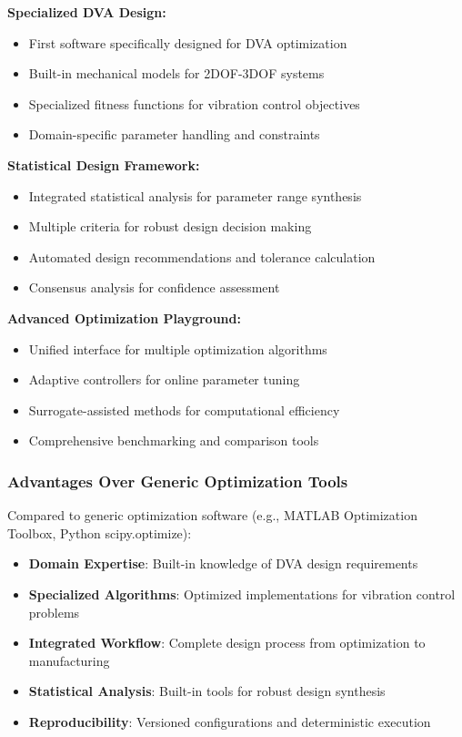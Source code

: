 \documentclass[12pt,a4paper]{article}
\begin{document}
\textbf{Specialized DVA Design:}
\begin{itemize}
    \item First software specifically designed for DVA optimization
    \item Built-in mechanical models for 2DOF-3DOF systems
    \item Specialized fitness functions for vibration control objectives
    \item Domain-specific parameter handling and constraints
\end{itemize}

\textbf{Statistical Design Framework:}
\begin{itemize}
    \item Integrated statistical analysis for parameter range synthesis
    \item Multiple criteria for robust design decision making
    \item Automated design recommendations and tolerance calculation
    \item Consensus analysis for confidence assessment
\end{itemize}

\textbf{Advanced Optimization Playground:}
\begin{itemize}
    \item Unified interface for multiple optimization algorithms
    \item Adaptive controllers for online parameter tuning
    \item Surrogate-assisted methods for computational efficiency
    \item Comprehensive benchmarking and comparison tools
\end{itemize}

\subsubsection{Advantages Over Generic Optimization Tools}

Compared to generic optimization software (e.g., MATLAB Optimization Toolbox, Python scipy.optimize):

\begin{itemize}
    \item \textbf{Domain Expertise}: Built-in knowledge of DVA design requirements
    \item \textbf{Specialized Algorithms}: Optimized implementations for vibration control problems
    \item \textbf{Integrated Workflow}: Complete design process from optimization to manufacturing
    \item \textbf{Statistical Analysis}: Built-in tools for robust design synthesis
    \item \textbf{Reproducibility}: Versioned configurations and deterministic execution
\end{itemize}
\end{document}
